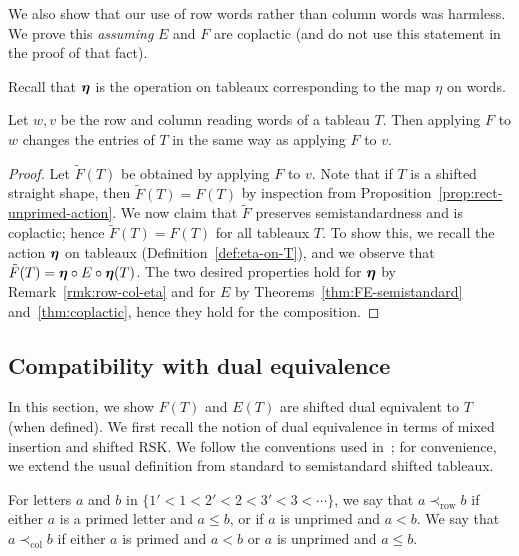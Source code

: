 \documentclass[ALCO,ThmDefs,Unicode,epreuves]{cedram}
\DeclareMathOperator{\row}{row}
\DeclareMathOperator{\col}{col}
\begin{document}
We also show that our use of row words rather than column words was harmless. We prove this \emph{assuming} $E$ and $F$ are coplactic (and do not use this statement in the proof of that fact). 

Recall that $\boldsymbol{\eta}$ is the operation on tableaux corresponding to the map $\eta$ on words.

\begin{prop} \label{prop:rows-columns}
Let $w, v$ be the row and column reading words of a tableau $T$. Then applying $F$ to $w$ changes the entries of $T$ in the same way as applying $F$ to $v$.
\end{prop}
\begin{proof}
Let $\tilde{F}(T)$ be obtained by applying $F$ to $v$. Note that if $T$ is a shifted straight shape, then $\tilde{F}(T) = F(T)$ by inspection from Proposition~\ref{prop:rect-unprimed-action}. We now claim that $\tilde{F}$ preserves semistandardness and is coplactic; hence $\tilde{F}(T) = F(T)$ for all tableaux $T$. To show this, we recall the action $\boldsymbol{\eta}$ on tableaux (Definition~\ref{def:eta-on-T}), and we observe that $\tilde{F}(T) = \boldsymbol{\eta} \circ E \circ \boldsymbol{\eta}(T)$. The two desired properties hold for $\boldsymbol{\eta}$ by Remark~\ref{rmk:row-col-eta} and for $E$ by Theorems~\ref{thm:FE-semistandard} and~\ref{thm:coplactic}, hence they hold for the composition.
\end{proof}



\subsection{Compatibility with dual equivalence}

In this section, we show $F(T)$ and $E(T)$ are shifted dual equivalent to $T$ (when defined). We first recall the notion of dual equivalence in terms of mixed insertion and shifted RSK. We follow the conventions used in~\cite{Sagan}; for convenience, we extend the usual definition from standard to semistandard shifted tableaux.

\begin{defi}
For letters $a$ and $b$ in $\{1'<1<2'<2<3'<3<\cdots\}$, we say that $a\prec_{\row} b$ if either $a$ is a primed letter and $a\le b$, or if $a$ is unprimed and $a<b$. We say that $a\prec_{\col} b$ if either $a$ is primed and $a<b$ or $a$ is unprimed and $a\le b$. 
\end{defi}
\end{document}
